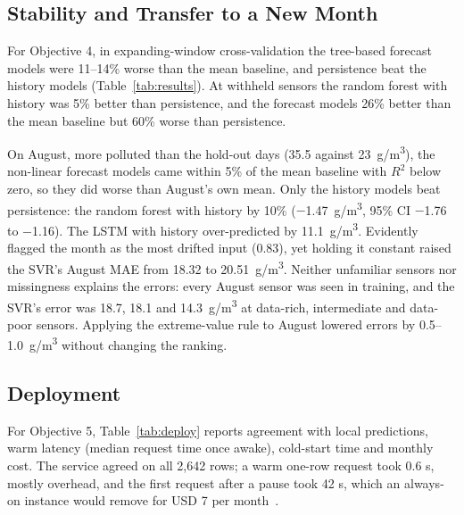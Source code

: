 \documentclass{ieeeaccess}
\newcommand{\ugm}{\textmu g/m\textsuperscript{3}}
\begin{document}
\subsection{Stability and Transfer to a New Month}\label{sec:stability-and-transfer-to-a-new-month}

For Objective 4, in expanding-window cross-validation the tree-based forecast models were 11--14\% worse than the mean baseline, and persistence beat the history models (Table~\ref{tab:results}). At withheld sensors the random forest with history was 5\% better than persistence, and the forecast models 26\% better than the mean baseline but 60\% worse than persistence.

On August, more polluted than the hold-out days (35.5 against 23~\ugm{}), the non-linear forecast models came within 5\% of the mean baseline with $R^2$ below zero, so they did worse than August's own mean. Only the history models beat persistence: the random forest with history by 10\% ($-$1.47~\ugm{}, 95\% CI $-$1.76 to $-$1.16). The LSTM with history over-predicted by 11.1~\ugm{}. Evidently flagged the month as the most drifted input (0.83), yet holding it constant raised the SVR's August MAE from 18.32 to 20.51~\ugm{}. Neither unfamiliar sensors nor missingness explains the errors: every August sensor was seen in training, and the SVR's error was 18.7, 18.1 and 14.3~\ugm{} at data-rich, intermediate and data-poor sensors. Applying the extreme-value rule to August lowered errors by 0.5--1.0~\ugm{} without changing the ranking.

\subsection{Deployment}\label{sec:deployment}

For Objective 5, Table~\ref{tab:deploy} reports agreement with local predictions, warm latency (median request time once awake), cold-start time and monthly cost. The service agreed on all 2,642 rows; a warm one-row request took 0.6 s, mostly overhead, and the first request after a pause took 42 s, which an always-on instance would remove for USD 7 per month~\cite{ref_render}.
\end{document}
